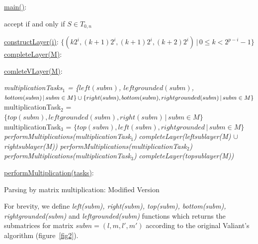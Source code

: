 \begin{algorithm}[!h]
\SetAlgoNoLine
{}
\underline{main()}{:}{

 accept if and only if $S \in T_{0, n}$
 \BlankLine
 }

\underline{constructLayer(i)}{:}{
 \BlankLine
 $\{(k2^i, (k+1)2^i, (k + 1)2^i, (k+2)2^i) \, |\, 0 \le k < 2^{p - i} - 1\}$
 \BlankLine
    }
\underline{completeLayer(M)}{:}{
\BlankLine
{}
\BlankLine
}

\underline{comleteVLayer(M)}{:}{
 \BlankLine
 \textit{multiplicationTasks$_1$ = \linebreak 
    \{$left(subm)$, $leftgrounded(subm)$, $bottom(subm)\, |\,subm \in M \} \cup \linebreak  \{right(subm), bottom(subm), rightgrounded(subm)\, |\,subm \in M\}$\;}
 \BlankLine
 multiplicationTask$_2$ = $\{top(subm), leftgrounded(subm), right(subm)\, |\,subm \in M\}$\;
 \BlankLine
 multiplicationTask$_3$ = $\{top(subm), left(subm), rightgrounded\, |\,subm \in M\}$\;
 \BlankLine
 \textit{performMultiplications(multiplicationTask$_1$)}\;
 \textit{completeLayer(leftsublayer(M) $\cup$ rightsublayer(M))}\;
 \textit{performMultiplications(multiplicationTask$_2$)}\;
 \textit{performMultiplications(multiplicationTask$_3$)}\;
 \textit{completeLayer(topsublayer(M))}

 }
 \BlankLine

 \underline{performMultiplication(tasks)}{:}{\\
 }

\caption{Parsing by matrix multiplication: Modified Version}
\label{algo:modified}
\end{algorithm}

For brevity, we define \textit{left(subm), right(subm), top(subm), bottom(subm), \linebreak rightgrounded(subm)} and \textit{leftgrounded(subm)} functions which returns the submatrices for matrix $subm = (l, m, l', m')$ according to the original Valiant's algorithm (figure~\ref{fig2}).

